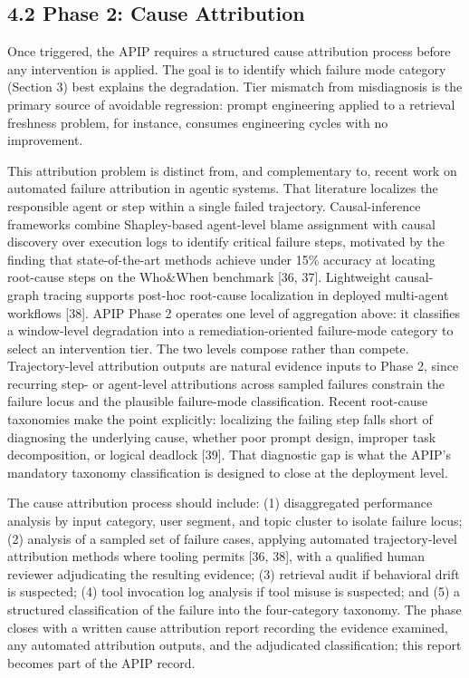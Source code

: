 \subsection{4.2  Phase 2: Cause Attribution}

Once triggered, the APIP requires a structured cause attribution process before any intervention is applied. The goal is to identify which failure mode category (Section 3) best explains the degradation. Tier mismatch from misdiagnosis is the primary source of avoidable regression: prompt engineering applied to a retrieval freshness problem, for instance, consumes engineering cycles with no improvement.

This attribution problem is distinct from, and complementary to, recent work on automated failure attribution in agentic systems. That literature localizes the responsible agent or step within a single failed trajectory. Causal-inference frameworks combine Shapley-based agent-level blame assignment with causal discovery over execution logs to identify critical failure steps, motivated by the finding that state-of-the-art methods achieve under 15\% accuracy at locating root-cause steps on the Who\&When benchmark [36, 37]. Lightweight causal-graph tracing supports post-hoc root-cause localization in deployed multi-agent workflows [38]. APIP Phase 2 operates one level of aggregation above: it classifies a window-level degradation into a remediation-oriented failure-mode category to select an intervention tier. The two levels compose rather than compete. Trajectory-level attribution outputs are natural evidence inputs to Phase 2, since recurring step- or agent-level attributions across sampled failures constrain the failure locus and the plausible failure-mode classification. Recent root-cause taxonomies make the point explicitly: localizing the failing step falls short of diagnosing the underlying cause, whether poor prompt design, improper task decomposition, or logical deadlock [39]. That diagnostic gap is what the APIP's mandatory taxonomy classification is designed to close at the deployment level.

The cause attribution process should include: (1) disaggregated performance analysis by input category, user segment, and topic cluster to isolate failure locus; (2) analysis of a sampled set of failure cases, applying automated trajectory-level attribution methods where tooling permits [36, 38], with a qualified human reviewer adjudicating the resulting evidence; (3) retrieval audit if behavioral drift is suspected; (4) tool invocation log analysis if tool misuse is suspected; and (5) a structured classification of the failure into the four-category taxonomy. The phase closes with a written cause attribution report recording the evidence examined, any automated attribution outputs, and the adjudicated classification; this report becomes part of the APIP record.

